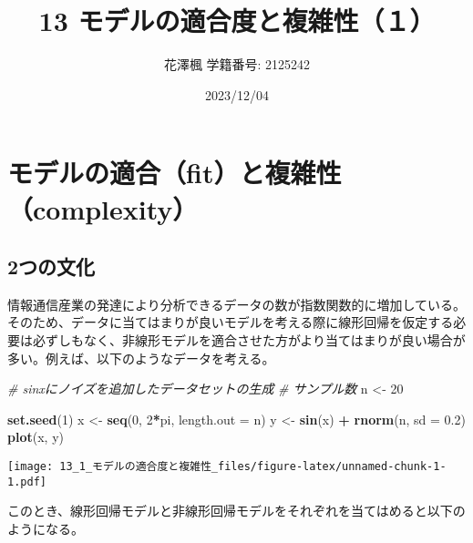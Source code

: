 \documentclass[
  pandoc,
  jafont=haranoaji]{bxjsarticle}
\title{13 モデルの適合度と複雑性（１）}
\author{花澤楓 学籍番号: 2125242}
\date{2023/12/04}
\newenvironment{Shaded}{\begin{snugshade}}{\end{snugshade}}
\newcommand{\AttributeTok}[1]{\textcolor[rgb]{0.13,0.29,0.53}{#1}}
\newcommand{\CommentTok}[1]{\textcolor[rgb]{0.56,0.35,0.01}{\textit{#1}}}
\newcommand{\DecValTok}[1]{\textcolor[rgb]{0.00,0.00,0.81}{#1}}
\newcommand{\FloatTok}[1]{\textcolor[rgb]{0.00,0.00,0.81}{#1}}
\newcommand{\FunctionTok}[1]{\textcolor[rgb]{0.13,0.29,0.53}{\textbf{#1}}}
\newcommand{\NormalTok}[1]{#1}
\newcommand{\OtherTok}[1]{\textcolor[rgb]{0.56,0.35,0.01}{#1}}
\newcommand{\SpecialCharTok}[1]{\textcolor[rgb]{0.81,0.36,0.00}{\textbf{#1}}}
\begin{document}
\maketitle

\hypertarget{ux30e2ux30c7ux30ebux306eux9069ux5408fitux3068ux8907ux96d1ux6027complexity}{%
\section{モデルの適合（fit）と複雑性（complexity）}\label{ux30e2ux30c7ux30ebux306eux9069ux5408fitux3068ux8907ux96d1ux6027complexity}}

\hypertarget{ux3064ux306eux6587ux5316}{%
\subsection{2つの文化}\label{ux3064ux306eux6587ux5316}}

情報通信産業の発達により分析できるデータの数が指数関数的に増加している。そのため、データに当てはまりが良いモデルを考える際に線形回帰を仮定する必要は必ずしもなく、非線形モデルを適合させた方がより当てはまりが良い場合が多い。例えば、以下のようなデータを考える。

\begin{Shaded}
\begin{Highlighting}[]
\CommentTok{\# sinxにノイズを追加したデータセットの生成}
\CommentTok{\# サンプル数}
\NormalTok{n }\OtherTok{\textless{}{-}} \DecValTok{20}

\FunctionTok{set.seed}\NormalTok{(}\DecValTok{1}\NormalTok{)}
\NormalTok{x }\OtherTok{\textless{}{-}} \FunctionTok{seq}\NormalTok{(}\DecValTok{0}\NormalTok{, }\DecValTok{2}\SpecialCharTok{*}\NormalTok{pi, }\AttributeTok{length.out =}\NormalTok{ n)}
\NormalTok{y }\OtherTok{\textless{}{-}} \FunctionTok{sin}\NormalTok{(x) }\SpecialCharTok{+} \FunctionTok{rnorm}\NormalTok{(n, }\AttributeTok{sd =} \FloatTok{0.2}\NormalTok{)}
\FunctionTok{plot}\NormalTok{(x, y)}
\end{Highlighting}
\end{Shaded}

\texttt{[image: 13\_1\_モデルの適合度と複雑性\_files/figure-latex/unnamed-chunk-1-1.pdf]}

このとき、線形回帰モデルと非線形回帰モデルをそれぞれを当てはめると以下のようになる。
\end{document}
